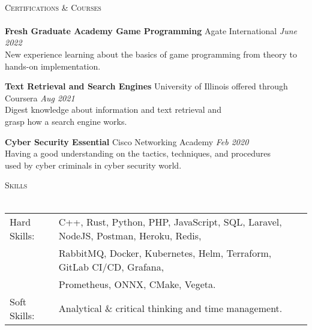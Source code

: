 \documentclass[a4paper]{article}
\newcommand{\lineunder} {
    \vspace*{-8pt} \\
    \hspace*{-18pt} \hrulefill \\
}
\newcommand{\header} [1] {
    {\hspace*{-18pt}\vspace*{6pt} \textsc{#1}}
    \vspace*{-6pt} \lineunder
}
\begin{document}
\

\header{Certifications \& Courses}
\textbf{Fresh Graduate Academy Game Programming} \hfill Agate International \textit{June 2022}\\
New experience learning about the basics of game programming from theory to hands-on implementation.
\vspace*{2mm}

\textbf{Text Retrieval and Search Engines} \hfill University of Illinois offered through Coursera \textit{Aug 2021}\\
Digest knowledge about information and text retrieval and\\ grasp how a search engine works.
\vspace*{2mm}




\textbf{Cyber Security Essential} \hfill Cisco Networking Academy \textit{Feb 2020}\\
Having a good understanding on the tactics, techniques, and procedures \\used by cyber criminals in cyber security world.
\vspace*{2mm}

\header{Skills}
\begin{tabular}{ l l }
	Hard Skills:              & C++, Rust, Python, PHP, JavaScript, SQL,  Laravel, NodeJS, Postman, Heroku, Redis, \\ & RabbitMQ, Docker, Kubernetes, Helm, Terraform, GitLab CI/CD, Grafana, \\ & Prometheus, ONNX, CMake, Vegeta.\\
	Soft Skills:                    & Analytical \& critical thinking and time management.\\
\end{tabular}
\vspace{2mm}

\ 
\end{document}
